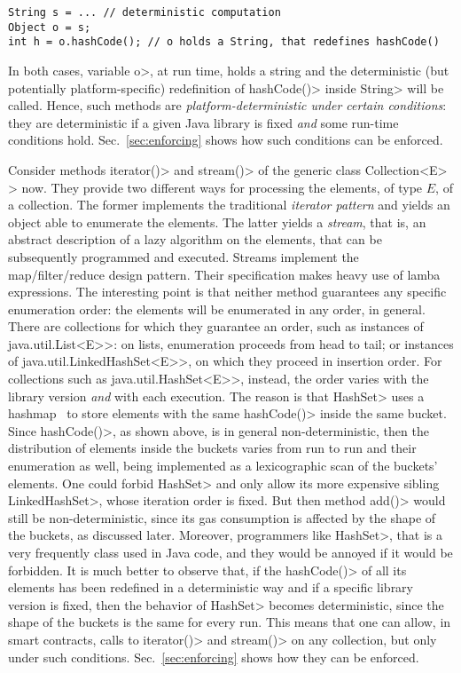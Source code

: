 {\small
\begin{verbatim}
String s = ... // deterministic computation
Object o = s;
int h = o.hashCode(); // o holds a String, that redefines hashCode()
\end{verbatim}}

\noindent
In both cases, variable \<o>, at run time,
holds a string and the deterministic (but potentially platform-specific)
redefinition of \<hashCode()> inside \<String> will be called.
Hence, such methods are \emph{platform-deterministic under certain conditions}:
they are deterministic if a given Java library is fixed \emph{and} some run-time conditions hold.
Sec.~\ref{sec:enforcing} shows how such conditions can be enforced.

Consider methods \<iterator()> and \<stream()> of the generic class
\<Collection$\text{<}$E$\text{>}$> now. They provide two different ways for
processing the elements, of type $E$, of a collection. The former implements
the traditional \emph{iterator pattern} and yields an object able to enumerate
the elements. The latter yields a \emph{stream}, that is,
an abstract description of a lazy algorithm on the
elements, that can be subsequently programmed and executed.
Streams implement the map/filter/reduce design pattern. Their specification
makes heavy use of lamba expressions.
The interesting point is that neither method
guarantees any specific enumeration order: the elements will be
enumerated in any order, in general. There are collections for which they
guarantee an order, such as instances of \<java.util.List$\text{<}$E$\text{>}$>:
on lists, enumeration proceeds from head to tail;
or instances of \<java.util.LinkedHashSet$\text{<}$E$\text{>}$>, on which they proceed in
insertion order.
For collections such as \<java.util.HashSet$\text{<}$E$\text{>}$>, instead, the order
varies with the library version \emph{and} with each execution. The reason is that
\<HashSet> uses a hashmap~\cite{CormenLRS09}
to store elements with the same \<hashCode()> inside the same bucket.
Since \<hashCode()>, as shown above, is in general non-deterministic, then
the distribution of elements inside the buckets varies from run to run and their enumeration
as well, being implemented as a lexicographic scan of the buckets' elements.
One could forbid \<HashSet> and only allow its
more expensive sibling \<LinkedHashSet>, whose iteration order is fixed.
But then method \<add()> would still be non-deterministic, since its gas consumption
is affected by the shape of the buckets, as discussed later.
Moreover, programmers like \<HashSet>, that is a very frequently class used
in Java code, and they would be annoyed if it would be
forbidden. It is much better to observe that,
if the \<hashCode()> of all its elements has been redefined in a deterministic way
and if a specific library version is fixed, then the behavior of \<HashSet> becomes
deterministic, since the shape of the buckets is the same for every run. This means that one
can allow, in smart contracts, calls to \<iterator()> and \<stream()> on any collection,
but only under such conditions. Sec.~\ref{sec:enforcing} shows how they can be enforced.

